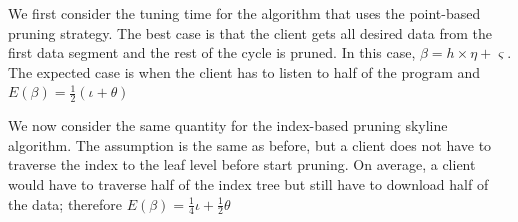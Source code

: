 \documentclass{sig-alternate}
\begin{document}
We first consider the tuning time for the algorithm that uses the
point-based pruning strategy. The best case is that the client gets all
desired data from the first data segment and the rest of the cycle is
pruned. In this case, $\beta = h \times \eta + \varsigma$. The expected
case is when the client has to listen to half of the program and
$E(\beta) = \frac{1}{2}(\iota + \theta)$

We now consider the same quantity for the index-based pruning skyline
algorithm. The assumption is the same as before, but a client does
not have to traverse the index to the leaf level before start pruning.
On average, a client would have to traverse half of the index tree but
still have to download half of the data;
therefore $E(\beta) = \frac{1}{4}\iota + \frac{1}{2}\theta$
%
%
%
%
%
%
%
%
%
\end{document}
